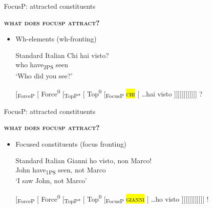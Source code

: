 \documentclass[lesson_slides]{subfiles}
\begin{document}
\begin{frame}[c]{FocusP: attracted constituents}

    \textbf{\textsc{what does focusp attract?}} \pause

    \begin{itemize}
        \item [\ding{227}] Wh-elements (wh-fronting) \pause

        \begin{exe}
         Standard Italian
            \gll Chi hai visto?\\
                who have\textsubscript{2PS} seen\\
            \glt \vspace*{-2mm} ‘Who did you see?’
        \label{ita}
        \end{exe} \pause
    
        [\textsubscript{ForceP} [ Force\textsuperscript{0} [\textsubscript{TopP*} [ Top\textsuperscript{0} [\textsubscript{FocusP} \textsc{\hl{chi}} [ \dots hai visto ]]]]]]]]]]]] ?
        
    \end{itemize}
    
  
\end{frame}
\begin{frame}[c]{FocusP: attracted constituents}

    \textbf{\textsc{what does focusp attract?}} \pause

    \begin{itemize}
        \item [\ding{227}] Focused constituents (focus fronting) \pause

        \begin{exe}
             Standard Italian
                \gll Gianni ho visto, non Marco!\\
                    John have\textsubscript{1PS} seen, not Marco\\
                \glt \vspace*{-2mm} ‘I saw John, not Marco’
            \label{ita}
        \end{exe} \pause
    
        [\textsubscript{ForceP} [ Force\textsuperscript{0} [\textsubscript{TopP*} [ Top\textsuperscript{0} [\textsubscript{FocusP} \textsc{\hl{gianni}} [ \dots ho visto ]]]]]]]]]]]] !
        
    \end{itemize}
    
  
\end{frame}
\end{document}
